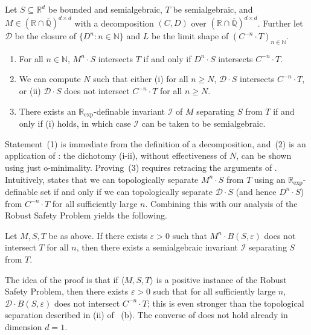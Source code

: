 \documentclass[a4paper,UKenglish,cleveref]{lipics-v2021}
\newcommand{\nat}{\mathbb{N}}
\newcommand{\rel}{\mathbb{R}}
\newcommand{\rat}{\mathbb{Q}}
\newcommand{\alg}{\overline{\rat}}
\newcommand{\ralg}{\rel \cap \alg}
\newcommand{\rexp}{\rel_{\exp}}
\newcommand{\Dcal}{\mathcal{D}}
\newcommand{\Ical}{\mathcal{I}}
\newcommand{\seq}[1]{(#1)_{n \in \mathbb{N}}}
\begin{document}
\begin{proposition}
	\label{thm:last-sec-invariants}
	Let $S \subseteq \rel^d$ be bounded and semialgebraic, $T$ be semialgebraic, and $M \in (\ralg)^{d\times d}$ with a decomposition $(C,D)$ over $(\ralg)^{d\times d}$.
	Further let $\Dcal$ be the closure of $\{D^n \colon n\in\nat\}$ and $L$ be the limit shape of $\seq{C^{-n} \cdot T}$.
	\begin{enumerate}
		\item For all $n \in \nat$, $M^n \cdot S$ intersects $T$ if and only if $D^n \cdot S$ intersects $C^{-n} \cdot T$.
		\item We can compute $N$ such that either (i) for all $n \ge N$, $\Dcal \cdot S$ intersects $C^{-n} \cdot T$, or (ii) $\Dcal \cdot S$ does not intersect $C^{-n} \cdot T$ for all $n \ge N$.
		\item There exists an $\rexp$-definable invariant $\Ical$ of $M$ separating $S$ from $T$ if and only if (i) holds, in which case $\Ical$ can be taken to be semialgebraic.
	\end{enumerate}
\end{proposition}

Statement~(1) is immediate from the definition of a decomposition, and~(2) is an application of : the dichotomy (i-ii), without effectiveness of $N$, can be shown using just o-minimality.
Proving~(3) requires retracing the arguments of \cite{almagor2022minimal}.
Intuitively,  states that we can topologically separate $M^n \cdot S$ from $T$ using an $\rexp$-definable set if and only if we can topologically separate $\Dcal \cdot S$ (and hence $D^n \cdot S$) from $C^{-n} \cdot T$ for all sufficiently large $n$.
Combining this with our analysis of the Robust Safety Problem yields the following.
\begin{proposition}
	\label{thm:rsp-inv}
	Let $M, S, T$ be as above. 
	If there exists $\varepsilon > 0$ such that $M^n \cdot B(S,\varepsilon)$ does not intersect $T$ for all $n$, then there exists a semialgebraic invariant $\Ical$ separating $S$ from $T$.
\end{proposition}
The idea of the proof is that if $\langle M,S,T \rangle$ is a positive instance of the Robust Safety Problem, then there exists $\varepsilon > 0$ 
such that for all sufficiently large $n$, $\Dcal \cdot B(S,\varepsilon)$ does not intersect $C^{-n} \cdot T$; this is even stronger than the topological separation described in (ii) of ~(b).
  The converse of  does not hold already in dimension $d = 1$.
\end{document}
